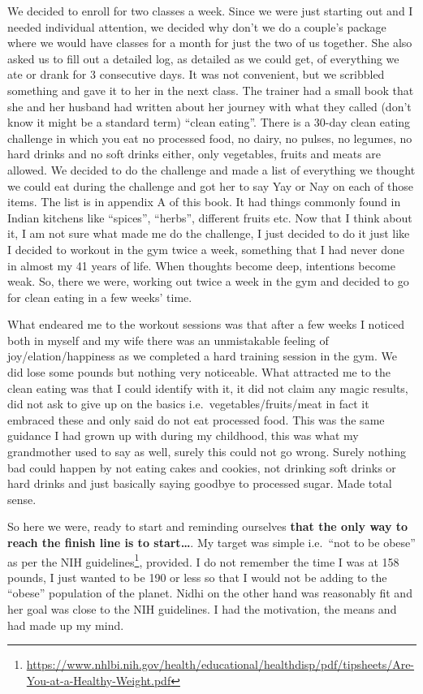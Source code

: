 \documentclass[
  oneside]{book}
\DeclareRobustCommand{\href}[2]{#2\footnote{\url{#1}}}
\begin{document}
We decided to enroll for two classes a week. Since we were just starting out and I needed individual attention, we decided why don't we do a couple's package where we would have classes for a month for just the two of us together. She also asked us to fill out a detailed log, as detailed as we could get, of everything we ate or drank for 3 consecutive days. It was not convenient, but we scribbled something and gave it to her in the next class. The trainer had a small book that she and her husband had written about her journey with what they called (don't know it might be a standard term) ``clean eating''. There is a 30-day clean eating challenge in which you eat no processed food, no dairy, no pulses, no legumes, no hard drinks and no soft drinks either, only vegetables, fruits and meats are allowed. We decided to do the challenge and made a list of everything we thought we could eat during the challenge and got her to say Yay or Nay on each of those items. The list is in appendix A of this book. It had things commonly found in Indian kitchens like ``spices'', ``herbs'', different fruits etc. Now that I think about it, I am not sure what made me do the challenge, I just decided to do it just like I decided to workout in the gym twice a week, something that I had never done in almost my 41 years of life. When thoughts become deep, intentions become weak. So, there we were, working out twice a week in the gym and decided to go for clean eating in a few weeks' time.

What endeared me to the workout sessions was that after a few weeks I noticed both in myself and my wife there was an unmistakable feeling of joy/elation/happiness as we completed a hard training session in the gym. We did lose some pounds but nothing very noticeable. What attracted me to the clean eating was that I could identify with it, it did not claim any magic results, did not ask to give up on the basics i.e.~vegetables/fruits/meat in fact it embraced these and only said do not eat processed food. This was the same guidance I had grown up with during my childhood, this was what my grandmother used to say as well, surely this could not go wrong. Surely nothing bad could happen by not eating cakes and cookies, not drinking soft drinks or hard drinks and just basically saying goodbye to processed sugar. Made total sense.

So here we were, ready to start and reminding ourselves \textbf{that the only way to reach the finish line is to start\ldots{}}. My target was simple i.e.~``not to be obese'' as per the \href{https://www.nhlbi.nih.gov/health/educational/healthdisp/pdf/tipsheets/Are-You-at-a-Healthy-Weight.pdf}{NIH guidelines}, provided. I do not remember the time I was at 158 pounds, I just wanted to be 190 or less so that I would not be adding to the ``obese'' population of the planet. Nidhi on the other hand was reasonably fit and her goal was close to the NIH guidelines. I had the motivation, the means and had made up my mind.
\end{document}
